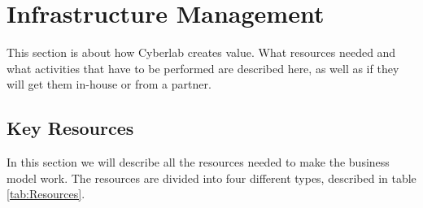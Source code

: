 \section{Infrastructure Management}
This section is about how Cyberlab creates value. What resources needed and what activities that have to be performed are described here, as well as if they will get them in-house or from a partner. 

\subsection{Key Resources}

In this section we will describe all the resources needed to make the business model work. The resources are divided into four different types, described in table \ref{tab:Resources}.
\newpage

